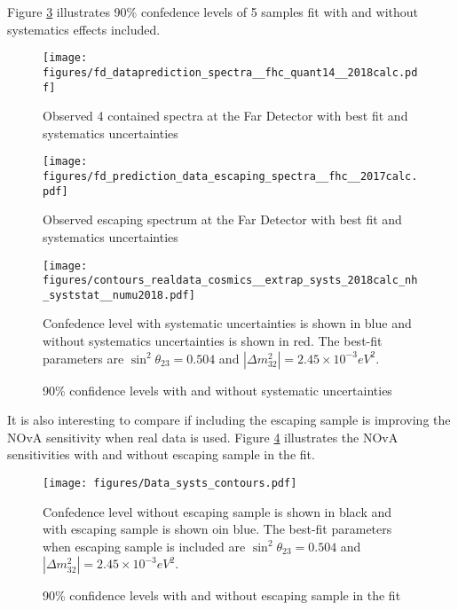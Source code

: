 Figure \ref{fig:cant_w_wo_syst} illustrates 90\% confedence levels of 5 samples fit with and without systematics effects 
included. 

\begin{figure}[!th]
\centering
\texttt{[image: figures/fd\_dataprediction\_spectra\_\_fhc\_quant14\_\_2018calc.pdf]}
\caption{Observed 4 contained spectra at the Far Detector with best fit and systematics uncertainties}
{}
\label{fig:dataprediction_cont}
\end{figure}

\begin{figure}[!th]
\centering
\texttt{[image: figures/fd\_prediction\_data\_escaping\_spectra\_\_fhc\_\_2017calc.pdf]}
\caption{Observed escaping spectrum at the Far Detector with best fit and systematics uncertainties}
{}
\label{fig:dataprediction_uncont}
\end{figure}

\begin{figure}[!th]
\centering
\texttt{[image: figures/contours\_realdata\_cosmics\_\_extrap\_systs\_2018calc\_nh\_syststat\_\_numu2018.pdf]}
\caption{90\% confidence levels with and without systematic uncertainties}
{Confedence level with systematic uncertainties is shown in blue and without systematics uncertainties is shown in red. 
The best-fit parameters are $\sin^2\theta_{23} = 0.504$ and $|\Delta m^2_{32}| = 2.45\times 10^{-3} eV^2$.}
\label{fig:cant_w_wo_syst}
\end{figure}

It is also interesting to compare if including the escaping sample is improving the NOvA sensitivity when real data is used.
Figure \ref{fig:contpurd_cont_uncont} illustrates the NOvA sensitivities with and without escaping sample in the fit. 


\begin{figure}[!th]
\centering
\texttt{[image: figures/Data\_systs\_contours.pdf]}
\caption{90\% confidence levels with and without escaping sample in the fit}
{Confedence level without escaping sample is shown in black and with escaping sample is shown oin blue. The best-fit 
parameters when escaping sample is included are $\sin^2\theta_{23} = 0.504$ and $|\Delta m^2_{32}| = 2.45\times 10^{-3} eV^2$.}
\label{fig:contpurd_cont_uncont}
\end{figure}

